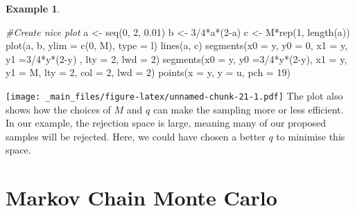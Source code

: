\documentclass[
]{book}
\newenvironment{Shaded}{\begin{snugshade}}{\end{snugshade}}
\newcommand{\AttributeTok}[1]{\textcolor[rgb]{0.77,0.63,0.00}{#1}}
\newcommand{\CommentTok}[1]{\textcolor[rgb]{0.56,0.35,0.01}{\textit{#1}}}
\newcommand{\DecValTok}[1]{\textcolor[rgb]{0.00,0.00,0.81}{#1}}
\newcommand{\FloatTok}[1]{\textcolor[rgb]{0.00,0.00,0.81}{#1}}
\newcommand{\FunctionTok}[1]{\textcolor[rgb]{0.00,0.00,0.00}{#1}}
\newcommand{\NormalTok}[1]{#1}
\newcommand{\OtherTok}[1]{\textcolor[rgb]{0.56,0.35,0.01}{#1}}
\newcommand{\SpecialCharTok}[1]{\textcolor[rgb]{0.00,0.00,0.00}{#1}}
\newcommand{\StringTok}[1]{\textcolor[rgb]{0.31,0.60,0.02}{#1}}
\theoremstyle{definition}
\theoremstyle{definition}
\newtheorem{example}{Example}[chapter]
\theoremstyle{definition}
\theoremstyle{definition}
\theoremstyle{remark}
\begin{document}
\begin{example}
\begin{Shaded}
\begin{Highlighting}[]
\CommentTok{\#Create nice plot}
\NormalTok{a }\OtherTok{\textless{}{-}} \FunctionTok{seq}\NormalTok{(}\DecValTok{0}\NormalTok{, }\DecValTok{2}\NormalTok{, }\FloatTok{0.01}\NormalTok{)}
\NormalTok{b }\OtherTok{\textless{}{-}} \DecValTok{3}\SpecialCharTok{/}\DecValTok{4}\SpecialCharTok{*}\NormalTok{a}\SpecialCharTok{*}\NormalTok{(}\DecValTok{2}\SpecialCharTok{{-}}\NormalTok{a)}
\NormalTok{c }\OtherTok{\textless{}{-}}\NormalTok{ M}\SpecialCharTok{*}\FunctionTok{rep}\NormalTok{(}\DecValTok{1}\NormalTok{, }\FunctionTok{length}\NormalTok{(a))}
\FunctionTok{plot}\NormalTok{(a, b, }\AttributeTok{ylim =} \FunctionTok{c}\NormalTok{(}\DecValTok{0}\NormalTok{, M), }\AttributeTok{type =} \StringTok{\textquotesingle{}l\textquotesingle{}}\NormalTok{)}
\FunctionTok{lines}\NormalTok{(a, c)}
\FunctionTok{segments}\NormalTok{(}\AttributeTok{x0 =}\NormalTok{ y, }\AttributeTok{y0 =} \DecValTok{0}\NormalTok{, }\AttributeTok{x1 =}\NormalTok{ y,  }\AttributeTok{y1 =}\DecValTok{3}\SpecialCharTok{/}\DecValTok{4}\SpecialCharTok{*}\NormalTok{y}\SpecialCharTok{*}\NormalTok{(}\DecValTok{2}\SpecialCharTok{{-}}\NormalTok{y) , }\AttributeTok{lty =} \DecValTok{2}\NormalTok{, }\AttributeTok{lwd =} \DecValTok{2}\NormalTok{)}
\FunctionTok{segments}\NormalTok{(}\AttributeTok{x0 =}\NormalTok{ y,  }\AttributeTok{y0 =}\DecValTok{3}\SpecialCharTok{/}\DecValTok{4}\SpecialCharTok{*}\NormalTok{y}\SpecialCharTok{*}\NormalTok{(}\DecValTok{2}\SpecialCharTok{{-}}\NormalTok{y), }\AttributeTok{x1 =}\NormalTok{ y, }\AttributeTok{y1 =}\NormalTok{ M, }\AttributeTok{lty =} \DecValTok{2}\NormalTok{, }\AttributeTok{col =} \DecValTok{2}\NormalTok{, }\AttributeTok{lwd =} \DecValTok{2}\NormalTok{)}
\FunctionTok{points}\NormalTok{(}\AttributeTok{x =}\NormalTok{ y, }\AttributeTok{y =}\NormalTok{ u, }\AttributeTok{pch =} \DecValTok{19}\NormalTok{)}
\end{Highlighting}
\end{Shaded}

\texttt{[image: \_main\_files/figure-latex/unnamed-chunk-21-1.pdf]}
The plot also shows how the choices of \(M\) and \(q\) can make the sampling more or less efficient. In our example, the rejection space is large, meaning many of our proposed samples will be rejected. Here, we could have chosen a better \(q\) to minimise this space.
\end{example}

\hypertarget{markov-chain-monte-carlo}{%
\section{Markov Chain Monte Carlo}\label{markov-chain-monte-carlo}}
\end{document}
